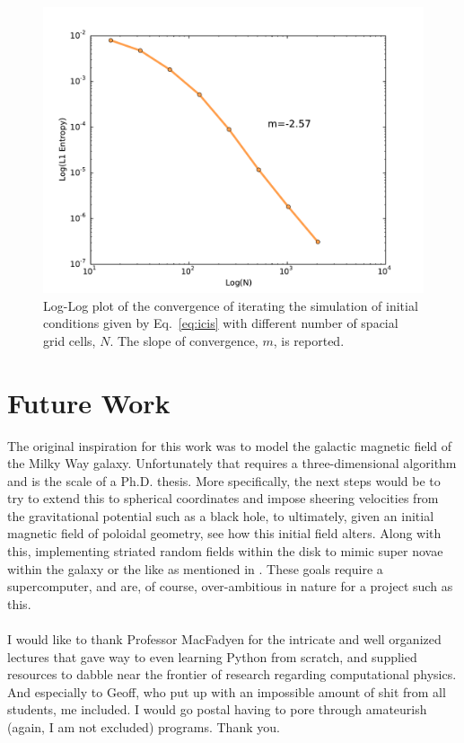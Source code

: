 \documentclass[iop,twocolumn]{emulateapj}
\begin{document}
\begin{figure}[htb!]
\includegraphics[scale=.45,trim=0cm 0cm 0cm 0cm,clip]{f3.pdf}
\caption{Log-Log plot of the convergence of iterating the simulation of initial conditions given by Eq.~\ref{eq:icis} with different number of spacial grid cells, $N$. The slope of convergence, $m$, is reported. \label{fig:f3}}
\end{figure}
\section{Future Work}
The original inspiration for this work was to model the galactic magnetic field of the Milky Way galaxy. Unfortunately that requires a three-dimensional algorithm and is the scale of a Ph.D. thesis. More specifically, the next steps would be to try to extend this to spherical coordinates and impose sheering velocities from the gravitational potential such as a black hole, to ultimately, given an initial magnetic field of poloidal geometry, see how this initial field alters. Along with this, implementing striated random fields within the disk to mimic super novae within the galaxy or the like as mentioned in \cite{jansson12a}. These goals require a supercomputer, and are, of course, over-ambitious in nature for a project such as this.\\
\vspace{1.2cm}
\\
I would like to thank Professor MacFadyen for the intricate and well organized lectures that gave way to even learning Python from scratch, and supplied resources to dabble near the frontier of research regarding computational physics. And especially to Geoff, who put up with an impossible amount of shit from all students, me included. I would go postal having to pore through amateurish (again, I am not excluded) programs. Thank you.
\end{document}
